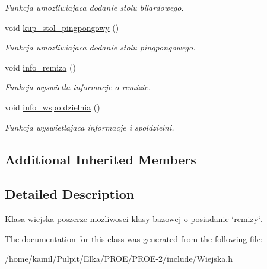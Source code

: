 \begin{DoxyCompactItemize}
\begin{DoxyCompactList}\small\item\em Funkcja umozliwiajaca dodanie stolu bilardowego. \end{DoxyCompactList}\item 
\hypertarget{class_wiejska_a08bdb7517c1f7df61993db56adbc1c74}{}void \hyperlink{class_wiejska_a08bdb7517c1f7df61993db56adbc1c74}{kup\+\_\+stol\+\_\+pingpongowy} ()\label{class_wiejska_a08bdb7517c1f7df61993db56adbc1c74}

\begin{DoxyCompactList}\small\item\em Funkcja umozliwiajaca dodanie stolu pingpongowego. \end{DoxyCompactList}\item 
\hypertarget{class_wiejska_a807a65b9b6b956d7f4a15cb463ad2a4c}{}void \hyperlink{class_wiejska_a807a65b9b6b956d7f4a15cb463ad2a4c}{info\+\_\+remiza} ()\label{class_wiejska_a807a65b9b6b956d7f4a15cb463ad2a4c}

\begin{DoxyCompactList}\small\item\em Funkcja wyswietla informacje o remizie. \end{DoxyCompactList}\item 
\hypertarget{class_wiejska_a2fb45e3f98a63f1aa0252e2daa3e3c1a}{}void \hyperlink{class_wiejska_a2fb45e3f98a63f1aa0252e2daa3e3c1a}{info\+\_\+wspoldzielnia} ()\label{class_wiejska_a2fb45e3f98a63f1aa0252e2daa3e3c1a}

\begin{DoxyCompactList}\small\item\em Funkcja wyswietlajaca informacje i spoldzielni. \end{DoxyCompactList}\end{DoxyCompactItemize}
\subsection*{Additional Inherited Members}


\subsection{Detailed Description}
Klasa wiejska poszerze mozliwosci klasy bazowej o posiadanie \char`\"{}remizy\char`\"{}. 

The documentation for this class was generated from the following file\+:\begin{DoxyCompactItemize}
\item 
/home/kamil/\+Pulpit/\+Elka/\+P\+R\+O\+E/\+P\+R\+O\+E-\/2/include/Wiejska.\+h\end{DoxyCompactItemize}

